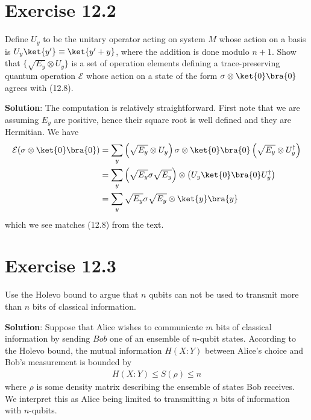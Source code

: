 \documentclass{book}
\newcommand{\mc}[1]{\mathcal{#1}}
\begin{document}
\section*{Exercise 12.2}
    Define $U_y$ to be the unitary operator acting on system $M$ whose action on a basis is $U_y \ket{y'} \equiv \ket{y' + y}$, where the addition is done modulo $n + 1$. Show that $\{\sqrt{E_y} \otimes U_y\}$ is a set of operation elements defining a trace-preserving quantum operation $\mc{E}$ whose action on a state of the form $\sigma \otimes \ket{0}\bra{0}$ agrees with (12.8).
    
    \textbf{Solution}: The computation is relatively straightforward. First note that we are assuming $E_y$ are positive, hence their square root is well defined and they are Hermitian. We have
    \begin{align}
    \begin{aligned}
        \mc{E}(\sigma \otimes \ket{0} \bra{0}) &=\sum_y \left(\sqrt{E_y} \otimes U_y\right) \sigma \otimes \ket{0}\bra{0} \left(\sqrt{E_y} \otimes U_y^\dagger\right) \\
        &= \sum_y \left(\sqrt{E_y} \sigma \sqrt{E_y}\right) \otimes \left(U_y \ket{0}\bra{0} U_y^\dagger\right) \\
        &= \sum_y \sqrt{E_y} \sigma \sqrt{E_y} \otimes \ket{y}\bra{y}
    \end{aligned}
    \end{align}
    which we see matches (12.8) from the text.
    
\section*{Exercise 12.3}
    Use the Holevo bound to argue that $n$ qubits can not be used to transmit more than $n$ bits of classical information.
    
    \textbf{Solution}: Suppose that Alice wishes to communicate $m$ bits of classical information by sending $Bob$ one of an ensemble of $n$-qubit states. According to the Holevo bound, the mutual information $H(X:Y)$ between Alice's choice and Bob's measurement is bounded by
    \begin{align}
        H(X:Y) \leq S(\rho) \leq n
    \end{align}
    where $\rho$ is some density matrix describing the ensemble of states Bob receives. We interpret this as Alice being limited to transmitting $n$ bits of information with $n$-qubits.
    
\end{document}
